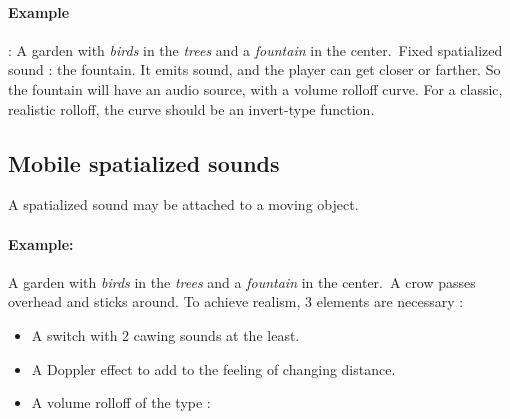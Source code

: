 \documentclass[a4paper,10pt]{article}
\begin{document}
\paragraph{Example} : A garden with \emph{birds} in the \emph{trees} and a \emph{fountain} in the center.\
Fixed spatialized sound : the fountain. It emits sound, and the player can get closer or farther. So the fountain will have an audio source, with a volume rolloff curve. For a classic, realistic rolloff, the curve should be an invert-type function.\




\subsection{Mobile spatialized sounds}
A spatialized sound may be attached to a moving object.
\paragraph{Example: } A garden with \emph{birds} in the \emph{trees} and a \emph{fountain} in the center.\
A crow passes overhead and sticks around. To achieve realism, 3 elements are necessary :

\begin{itemize}
\item A switch with 2 cawing sounds at the least.
\item A Doppler effect to add to the feeling of changing distance.
\item A volume rolloff of the type :\
\end{itemize}


\end{document}
